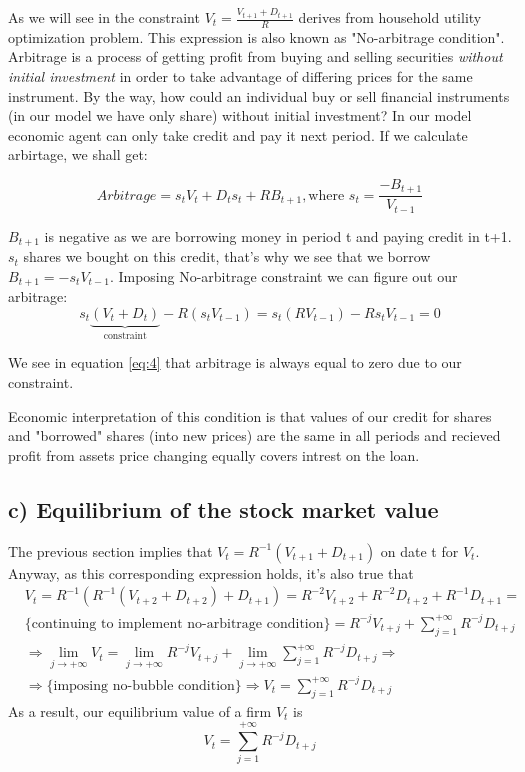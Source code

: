 \documentclass{article}
\begin{document}
As we will see in  the constraint $V_t = \frac{V_{t+1}+D_{t+1}}{R}$ derives from household utility optimization problem. This expression is also known as "No-arbitrage condition". Arbitrage is a process of getting profit from buying and selling securities \textit{without initial investment} in order to take advantage of differing prices for the same instrument. By the way, how could an individual buy or sell financial instruments (in our model we have only share) without initial investment? In our model economic agent can only take credit and pay it next period. If we calculate arbirtage, we shall get:

\begin{equation*}
\textit{Arbitrage} = s_t V_t + D_t s_t + RB_{t+1}, \text{where }s_t = \frac{-B_{t+1}}{V_{t-1}}
\end{equation*}

$B_{t+1}$ is negative as we are borrowing money in period t and paying credit in t+1. $s_t$ shares we bought on this credit, that's why we see that we borrow $B_{t+1} = -s_t V_{t-1}$.
Imposing No-arbitrage constraint we can figure out our arbitrage:
\begin{equation} \label{eq:4}
	s_t\underbrace{(V_t + D_t)}_\text{constraint} - R(s_t V_{t-1}) = s_t (RV_{t-1}) - Rs_t V_{t-1} = 0
\end{equation}

We see in  equation \ref{eq:4} that arbitrage is always equal to zero due to our constraint.

Economic interpretation of this condition is that values of our credit for shares and "borrowed" shares (into new prices) are the same in all periods and recieved profit from assets price changing equally covers intrest on the loan.

\subsection*{c) Equilibrium of the stock market value} \label{subsec:c}

The previous section implies that $ V_t = R^{-1}(V_{t+1} + D_{t+1}) $ on date t for $ V_t $. Anyway, as this corresponding expression holds, it's also true that
\begin{align*}
	& V_t = R^{-1}(R^{-1}(V_{t+2} + D_{t+2}) + D_{t+1}) = R^{-2}V_{t+2} + R^{-2}D_{t+2} + R^{-1}D_{t+1} = \\
	& \text{\{continuing to implement no-arbitrage condition\}} = R^{-j}V_{t+j} + \sum_{j=1}^{+\infty}R^{-j}D_{t+j} \\
	& \Rightarrow \lim_{j \rightarrow +\infty} V_t = \lim_{j \rightarrow +\infty}R^{-j}V_{t+j} + \lim_{j \rightarrow +\infty}\sum_{j=1}^{+\infty}R^{-j}D_{t+j} \Rightarrow \\ 
	& \Rightarrow \text{\{imposing no-bubble condition\}} \Rightarrow V_t = \sum_{j=1}^{+\infty}R^{-j}D_{t+j}
\end{align*}
As a result, our equilibrium value of a firm $ V_t $ is
\begin{equation}
	V_t = \sum_{j=1}^{+\infty}R^{-j}D_{t+j}
\end{equation}
\end{document}
